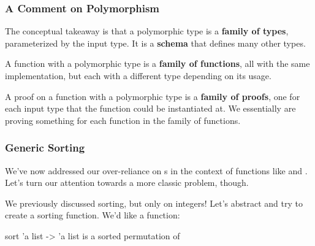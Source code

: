 \documentclass[aspectratio=169, handout]{beamer}
\begin{document}
\begin{frame}[fragile]
  \frametitle{A Comment on Polymorphism}

  \tgs

  The conceptual takeaway is that a polymorphic type is a \textbf{family of types},
  parameterized by the input type. It is a \textbf{schema} that defines many other
  types.

  \pause
  \vspace{\fill}

  A function with a polymorphic type is a \textbf{family of functions}, all with
  the same implementation, but each with a different type depending on its usage.

  \pause
  \vspace{\fill}

  A proof on a function with a polymorphic type is a \textbf{family of proofs},
  one for each input type that the function could be instantiated at. We essentially
  are proving something for each function in the family of functions.
\end{frame}



\begin{frame}[fragile]
  \frametitle{Generic Sorting}

  We've now addressed our over-reliance on s in the context of functions like
   and . Let's turn our attention towards a more classic problem,
  though.

  \pause
  \vspace{\fill}

  We previously discussed sorting, but only on integers! Let's abstract and try to create a
   sorting function. We'd like a function:

  \pause
  \vspace{\fill}

  \spec
    {sort}
    {'a list -> 'a list}
    {}
    { is a sorted permutation of }

\end{frame}
\end{document}
